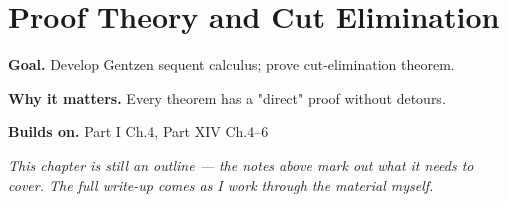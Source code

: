 \chapter{Proof Theory and Cut Elimination}
\label{ch:14-metamathematics-08}

\begin{chapterintro}
\textbf{Goal.} Develop Gentzen sequent calculus; prove cut-elimination theorem.

\textbf{Why it matters.} Every theorem has a "direct" proof without detours.

\textbf{Builds on.} Part I Ch.4, Part XIV Ch.4–6
\end{chapterintro}

\textit{This chapter is still an outline --- the notes above mark out what it needs to cover. The full write-up comes as I work through the material myself.}
